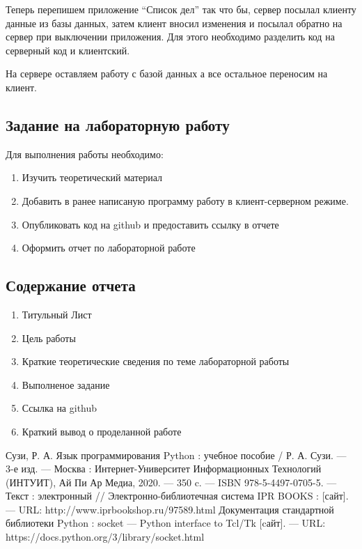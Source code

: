 \documentclass[a4paper]{article}
\begin{document}
Теперь перепишем приложение ``Список дел'' так что бы, сервер посылал клиенту данные из базы данных, затем клиент вносил изменения и посылал обратно на сервер при выключении приложения. Для этого необходимо разделить код на серверный код и клиентский.

На сервере оставляем работу с базой данных а все остальное переносим на клиент.






\newpage
\subsection{Задание на лабораторную работу}

Для выполнения работы необходимо:
\begin{enumerate}
  \item Изучить теоретический материал
  \item Добавить в ранее написаную программу работу в клиент-серверном режиме.
  \item Опубликовать код на github и предоставить ссылку в отчете
  \item Оформить отчет по лабораторной работе
\end{enumerate}

\subsection{Содержание отчета}
\begin{enumerate}
  \item Титульный Лист
  \item Цель работы
  \item Краткие теоретические сведения по теме лабораторной работы
  \item Выполненое задание
  \item Ссылка на github
  \item Краткий вывод о проделанной работе
\end{enumerate}

\begin{thebibliography}{3}
  Сузи, Р. А. Язык программирования Python : учебное пособие / Р. А. Сузи. — 3-е изд. — Москва : Интернет-Университет Информационных Технологий (ИНТУИТ), Ай Пи Ар Медиа, 2020. — 350 c. — ISBN 978-5-4497-0705-5. — Текст : электронный // Электронно-библиотечная система IPR BOOKS : [сайт]. — URL: http://www.iprbookshop.ru/97589.html
   Документация стандартной библиотеки Python : socket — Python interface to Tcl/Tk [cайт]. --- URL: https://docs.python.org/3/library/socket.html
\end{thebibliography}
\end{document}

